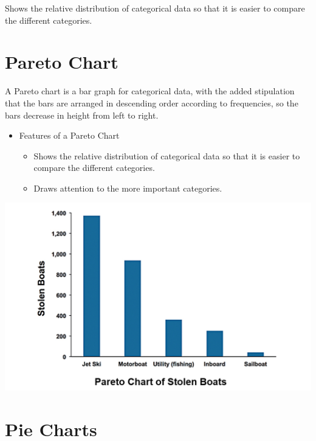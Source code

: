 \documentclass[]{book}
\providecommand{\tightlist}{%
  \setlength{\itemsep}{0pt}\setlength{\parskip}{0pt}}
\begin{document}
Shows the relative distribution of categorical data so that it is easier to compare the different categories.

\hypertarget{pareto-chart}{%
\section{Pareto Chart}\label{pareto-chart}}

A Pareto chart is a bar graph for categorical data, with the added stipulation that the bars are arranged in descending order according to frequencies, so the bars decrease in height from left to right.

\begin{itemize}
\tightlist
\item
  Features of a Pareto Chart

  \begin{itemize}
  \tightlist
  \item
    Shows the relative distribution of categorical data so that it is easier to compare the different categories.
  \item
    Draws attention to the more important categories.
  \end{itemize}
\end{itemize}

\includegraphics{pareto.png}

\hypertarget{pie-charts}{%
\section{Pie Charts}\label{pie-charts}}
\end{document}
